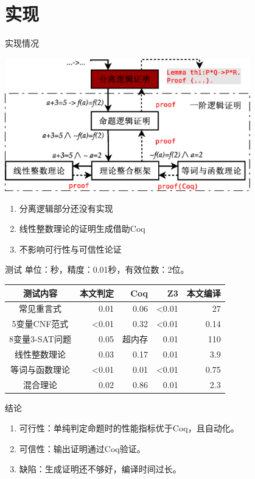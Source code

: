 \documentclass{beamer}
\begin{document}
\section{实现}
\begin{frame}[fragile]
  \begin{block}{实现情况}
    \begin{center}
    \includegraphics[width=0.8\textwidth]{strux.eps}
    \end{center}
  \end{block}
  \begin{block}{}
    \begin{enumerate}
    \item 分离逻辑部分还没有实现
    \item 线性整数理论的证明生成借助Coq
    \item 不影响可行性与可信性论证
    \end{enumerate}
  \end{block}
\end{frame}

\begin{frame}[fragile]
\begin{block}{测试}
  单位：秒，精度：0.01秒，有效位数：2位。
    \begin{tabular}{crrrr}
    \hline
    测试内容 & 本文判定 & Coq & Z3 & 本文编译 \\
    \hline
    常见重言式 & 0.01 & 0.06 & <0.01 & 27 \\
    5变量CNF范式 & <0.01 & 0.32 & <0.01 & 0.14 \\
    8变量3-SAT问题 & 0.05 & 超内存 & 0.01 & 110 \\
    线性整数理论 & 0.03 & 0.17 & 0.01 & 3.9 \\
    等词与函数理论 & <0.01 & 0.01 & <0.01 & 0.75 \\
    混合理论 & 0.02 & 0.86 & 0.01 & 2.3 \\
    \hline
  \end{tabular}
\end{block}
\begin{block}{结论}
  \begin{enumerate}
  \item 可行性：单纯判定命题时的性能指标优于Coq，且自动化。
  \item 可信性：输出证明通过Coq验证。
  \item 缺陷：生成证明还不够好，编译时间过长。
  \end{enumerate}
\end{block}
\end{frame}
\end{document}
